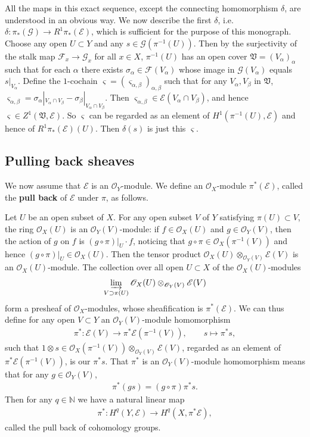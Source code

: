 \documentclass[12pt,b5paper,notitlepage]{report}
\theoremstyle{definition}
\theoremstyle{plain}
\newcommand{\fk}{\mathfrak}
\newcommand{\scr}{\mathscr}
\numberwithin{equation}{section}
\begin{document}
All the maps in this exact sequence, except the connecting homomorphism $\delta$,  are understood in an obvious way. We now describe the first $\delta$, i.e. $\delta:\pi_*(\scr G)\rightarrow R^1\pi_*(\scr E)$, which is sufficient for the purpose of this monograph. Choose any open $ U\subset Y$ and any $s\in\scr G(\pi^{-1}( U))$. Then by the surjectivity of the stalk map $\scr F_x\rightarrow\scr G_x$ for all $x\in X$, $\pi^{-1}( U)$ has an open cover $\fk V=(V_\alpha)_\alpha$ such that for each $\alpha$ there exists $\sigma_\alpha\in \scr F( V_\alpha)$ whose image in $\scr G( V_\alpha)$ equals $s|_{ V_\alpha}$. Define the $1$-cochain $\varsigma=(\varsigma_{\alpha,\beta})_{\alpha,\beta}$ such that for any $ V_\alpha, V_\beta$ in $\fk V$, $\varsigma_{\alpha,\beta}=\sigma_\alpha|_{ V_\alpha\cap V_\beta}-\sigma_\beta|_{ V_\alpha\cap V_\beta}$. Then $\varsigma_{\alpha,\beta}\in\scr E( V_\alpha\cap V_\beta)$, and hence $\varsigma\in Z^1(\fk V,\scr E)$. So $\varsigma$ can be regarded as an element of $H^1(\pi^{-1}( U),\scr E)$ and hence of $R^1\pi_*(\scr E)(U)$. Then $\delta (s)$ is just this $\varsigma$.


\subsection*{Pulling back  sheaves}


We now assume that $\scr E$ is an $\scr O_Y$-module. We define an $\scr O_X$-module $\pi^*(\scr E)$, called the \textbf{pull back} of $\scr E$ under $\pi$, \index{Epi@$\pi^*(\scr E),\pi^*s$} as follows. 


Let $U$ be an open subset of $X$. For any open subset $V$ of $Y$ satisfying $\pi(U)\subset V$, the ring $\scr O_X(U)$ is an $\scr O_Y(V)$-module: if $f\in\scr O_X(U)$ and $g\in\scr O_Y(V)$, then the action of $g$ on $f$ is $(g\circ \pi)|_U\cdot f$, noticing that $g\circ \pi\in\scr O_X(\pi^{-1}(V))$ and hence $(g\circ \pi)|_U\in\scr O_X(U)$. Then the tensor product $\scr O_X(U)\otimes_{\scr O_Y(V)}\scr E(V)$ is an $\scr O_X(U)$-module. The collection over all open $U\subset X$ of the $\scr O_X(U)$-modules
\begin{align*}
\varinjlim_{V\supset \pi(U)}\scr O_X(U)\otimes_{\scr O_Y(V)}\scr E(V)
\end{align*}
form a presheaf of $\scr O_X$-modules, whose sheafification is $\pi^*(\scr E)$. We can thus define  for any open $V\subset Y$ an $\scr O_Y(V)$-module homomorphism
\begin{align}
\pi^*:\scr E(V)\rightarrow\pi^*\scr E(\pi^{-1}(V)),\qquad s\mapsto\pi^*s,\label{eq139}
\end{align}
such that  $1\otimes s\in\scr O_X(\pi^{-1}(V))\otimes_{\scr O_Y(V)}\scr E(V)$, regarded as an element of $\pi^*\scr E(\pi^{-1}(V))$, is our $\pi^*s$. That $\pi^*$ is an $\scr O_Y(V)$-module homomorphism means that for any $g\in\scr O_Y(V)$,
\begin{align*}
\pi^*(gs)=(g\circ\pi)\pi^*s.
\end{align*}
Then for any $q\in\mathbb N$ we have a natural linear map
\begin{align*}
\pi^*:H^q(Y,\scr E)\rightarrow H^q(X,\pi^*\scr E),
\end{align*}
called the pull back of cohomology groups.
\end{document}
